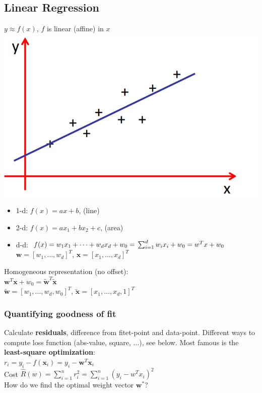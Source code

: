 \documentclass[a4paper, fontsize=8pt, landscape, DIV=1]{scrartcl}
\begin{document}
\begin{multicols*}{4}
		\subsection{Linear Regression}
		$y\approx f(x)$, $f$ is linear (affine) in $x$
		\includegraphics[width=\columnwidth]{images/Regression/linear_regression.png}
		\begin{itemize}[noitemsep]
			\item 1-d: $f(x)=ax+b$, (line)
			\item 2-d: $f(x)=ax_1+bx_2+c$, (area)
			\item d-d: $f(x)=w_1x_1+\dots+w_dx_d+w_0=\\\sum_{i=1}^{d}w_ix_i+w_0=w^Tx+w_0$\\
			$\mathbf{w}=[w_1,\dots,w_d]^T$, $\mathbf{x}=[x_1,\dots,x_d]^T$
		\end{itemize}
		Homogeneous representation (no offset):\\
		$\mathbf{w}^T\mathbf{x}+w_0=\tilde{\mathbf{w}}^T\tilde{\mathbf{x}}$\\
		$\tilde{\textbf{w}}=[w_1,\dots,w_d,w_0]^T$, $\tilde{\textbf{x}}=[x_1,\dots,x_d,1]^T$\\
		
		\subsubsection{Quantifying goodness of fit}
		Calculate \textbf{residuals}, difference from fitet-point and data-point. Different ways to compute loss function (abs-value, square, ...), see below. Most famous is the \textbf{least-square optimization}: \\
		$r_i=y_i-f(\mathbf{x}_i)=y_i-\textbf{w}^T\textbf{x}_i$\\
		Cost $\hat{R}(w)=\sum_{i=1}^{n}r_i^2=\sum_{i=1}^{n}(y_i-w^Tx_i)^2$\\
		How do we find the optimal weight vector $\textbf{w}^*$?
		

\end{multicols*}
\end{document}
